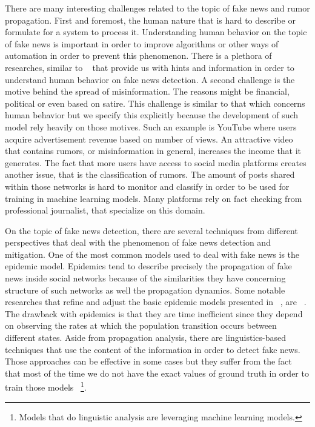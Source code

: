 There are many interesting challenges related to the topic of fake news and rumor propagation. First and foremost, the human nature that is hard to describe or formulate for a system to process it. Understanding human behavior on the topic of fake news is important in order to improve algorithms or other ways of automation in order to prevent this phenomenon. There is a plethora of researches, similar to ~\cite{FAKEnewsCovidERA,TrueFalseNewsOnline,ImpliedTEpennycock} that provide us with hints and information in order to understand human behavior on fake news detection. A second challenge is the motive behind the spread of misinformation. The reasons might be financial, political or even based on satire. This challenge is similar to that which concerns human behavior but we specify this explicitly because the development of such model rely heavily on those motives. Such an example is YouTube where users acquire advertisement revenue based on number of views. An attractive video that contains rumors, or misinformation in general, increases the income that it generates. The fact that more users have access to social media platforms creates another issue, that is the classification of rumors. The amount of posts shared within those networks is hard to monitor and classify in order to be used for training in machine learning models. Many platforms rely on fact checking from professional journalist, that specialize on this domain. 

On the topic of fake news detection, there are several techniques from different perspectives that deal with the phenomenon of fake news detection and mitigation. One of the most common models used to deal with fake news is the epidemic model. Epidemics tend to describe precisely the propagation of fake news inside social networks because of the similarities they have concerning structure of such networks as well the propagation dynamics. Some notable researches that refine and adjust the basic epidemic models presented in ~\cite{Kleinberg}, are ~\cite{SEIZ,SIHR_probGeneratingFunct,EpidemicMeanField,SimpleSIHR,VirusWithProfiles,NetworkTopologyEpidemics}. The drawback with epidemics is that they are time inefficient since they depend on observing the rates at which the population transition occurs between different states. Aside from propagation analysis, there are linguistics-based techniques that use the content of the information in order to detect fake news. Those approaches can be effective in some cases but they suffer from the fact that most of the time we do not have the exact values of ground truth in order to train those models ~\footnote{Models that do linguistic analysis are leveraging machine learning models.}. 


